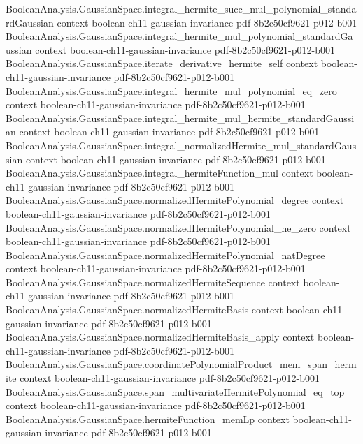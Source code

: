 \begin{lemma}
\proofstep
  {BooleanAnalysis.GaussianSpace.integral_hermite_succ_mul_polynomial_standardGaussian}
  {context}
  {boolean-ch11-gaussian-invariance}
  {pdf-8b2c50cf9621-p012-b001}
\proofstep
  {BooleanAnalysis.GaussianSpace.integral_hermite_mul_polynomial_standardGaussian}
  {context}
  {boolean-ch11-gaussian-invariance}
  {pdf-8b2c50cf9621-p012-b001}
\proofstep
  {BooleanAnalysis.GaussianSpace.iterate_derivative_hermite_self}
  {context}
  {boolean-ch11-gaussian-invariance}
  {pdf-8b2c50cf9621-p012-b001}
\proofstep
  {BooleanAnalysis.GaussianSpace.integral_hermite_mul_polynomial_eq_zero}
  {context}
  {boolean-ch11-gaussian-invariance}
  {pdf-8b2c50cf9621-p012-b001}
\proofstep
  {BooleanAnalysis.GaussianSpace.integral_hermite_mul_hermite_standardGaussian}
  {context}
  {boolean-ch11-gaussian-invariance}
  {pdf-8b2c50cf9621-p012-b001}
\proofstep
  {BooleanAnalysis.GaussianSpace.integral_normalizedHermite_mul_standardGaussian}
  {context}
  {boolean-ch11-gaussian-invariance}
  {pdf-8b2c50cf9621-p012-b001}
\proofstep
  {BooleanAnalysis.GaussianSpace.integral_hermiteFunction_mul}
  {context}
  {boolean-ch11-gaussian-invariance}
  {pdf-8b2c50cf9621-p012-b001}
\proofstep
  {BooleanAnalysis.GaussianSpace.normalizedHermitePolynomial_degree}
  {context}
  {boolean-ch11-gaussian-invariance}
  {pdf-8b2c50cf9621-p012-b001}
\proofstep
  {BooleanAnalysis.GaussianSpace.normalizedHermitePolynomial_ne_zero}
  {context}
  {boolean-ch11-gaussian-invariance}
  {pdf-8b2c50cf9621-p012-b001}
\proofstep
  {BooleanAnalysis.GaussianSpace.normalizedHermitePolynomial_natDegree}
  {context}
  {boolean-ch11-gaussian-invariance}
  {pdf-8b2c50cf9621-p012-b001}
\proofstep
  {BooleanAnalysis.GaussianSpace.normalizedHermiteSequence}
  {context}
  {boolean-ch11-gaussian-invariance}
  {pdf-8b2c50cf9621-p012-b001}
\proofstep
  {BooleanAnalysis.GaussianSpace.normalizedHermiteBasis}
  {context}
  {boolean-ch11-gaussian-invariance}
  {pdf-8b2c50cf9621-p012-b001}
\proofstep
  {BooleanAnalysis.GaussianSpace.normalizedHermiteBasis_apply}
  {context}
  {boolean-ch11-gaussian-invariance}
  {pdf-8b2c50cf9621-p012-b001}
\proofstep
  {BooleanAnalysis.GaussianSpace.coordinatePolynomialProduct_mem_span_hermite}
  {context}
  {boolean-ch11-gaussian-invariance}
  {pdf-8b2c50cf9621-p012-b001}
\proofstep
  {BooleanAnalysis.GaussianSpace.span_multivariateHermitePolynomial_eq_top}
  {context}
  {boolean-ch11-gaussian-invariance}
  {pdf-8b2c50cf9621-p012-b001}
\proofstep
  {BooleanAnalysis.GaussianSpace.hermiteFunction_memLp}
  {context}
  {boolean-ch11-gaussian-invariance}
  {pdf-8b2c50cf9621-p012-b001}
\proofstep

\end{lemma}
